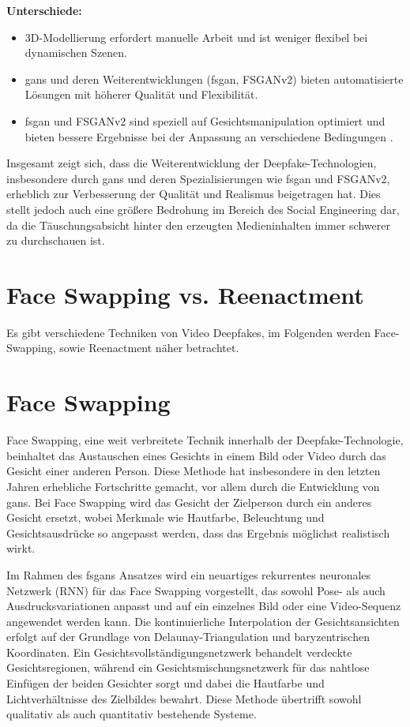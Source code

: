 \textbf{Unterschiede:}
\begin{itemize}
    \item 3D-Modellierung erfordert manuelle Arbeit und ist weniger flexibel bei dynamischen Szenen.
    \item \glspl{gan} und deren Weiterentwicklungen (\gls{fsgan}, FSGANv2) bieten automatisierte Lösungen mit höherer Qualität und Flexibilität.
    \item \gls{fsgan} und FSGANv2 sind speziell auf Gesichtsmanipulation optimiert und bieten bessere Ergebnisse bei der Anpassung an verschiedene Bedingungen \cite{Deepfakes-a-survey-and-introduction-to-the-topical-collection}.
\end{itemize}

Insgesamt zeigt sich, dass die Weiterentwicklung der Deepfake-Technologien, insbesondere durch \glspl{gan} und deren Spezialisierungen wie \gls{fsgan} und FSGANv2, erheblich zur Verbesserung der Qualität und Realismus beigetragen hat.
Dies stellt jedoch auch eine größere Bedrohung im Bereich des Social Engineering dar, da die Täuschungsabsicht hinter den erzeugten Medieninhalten immer schwerer zu durchschauen ist.


\section{Face Swapping vs. Reenactment}\label{sec:face-swapping-vs.-reenactment}
Es gibt verschiedene Techniken von Video Deepfakes, im Folgenden werden Face-Swapping, sowie Reenactment näher
betrachtet.

\section{Face Swapping}\label{sec:face-swapping}
Face Swapping, eine weit verbreitete Technik innerhalb der Deepfake-Technologie, beinhaltet das Austauschen eines
Gesichts in einem Bild oder Video durch das Gesicht einer anderen Person.
Diese Methode hat insbesondere in den letzten Jahren erhebliche Fortschritte gemacht, vor allem durch die Entwicklung von \glspl{gan}.
Bei Face Swapping wird das Gesicht der Zielperson durch ein anderes Gesicht ersetzt, wobei Merkmale wie Hautfarbe,
Beleuchtung und Gesichtsausdrücke so angepasst werden, dass das Ergebnis möglichst realistisch wirkt.

Im Rahmen des \glspl{fsgan}\cite{face-swapping-and-reenactment} Ansatzes wird ein neuartiges rekurrentes neuronales Netzwerk (RNN) für das Face Swapping vorgestellt, das sowohl Pose- als auch Ausdrucksvariationen anpasst und auf ein einzelnes Bild oder eine Video-Sequenz angewendet werden kann.
Die kontinuierliche Interpolation der Gesichtsansichten erfolgt auf der Grundlage von Delaunay-Triangulation und baryzentrischen Koordinaten.
Ein Gesichtsvollständigungsnetzwerk behandelt verdeckte Gesichtsregionen, während ein Gesichtsmischungsnetzwerk für das nahtlose Einfügen der beiden Gesichter sorgt und dabei die Hautfarbe und Lichtverhältnisse des Zielbildes bewahrt.
Diese Methode übertrifft sowohl qualitativ als auch quantitativ bestehende Systeme.

